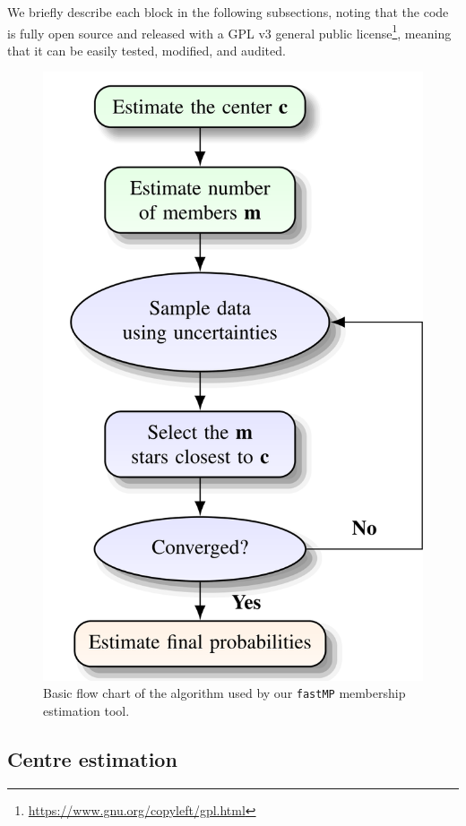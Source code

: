 \documentclass[fleqn,usenatbib]{mnras}
\begin{document}
We briefly describe each block in the following subsections, noting that the
code is fully open source and released with a GPL v3 general public
license\footnote{\url{https://www.gnu.org/copyleft/gpl.html}}, meaning that it
can be easily tested, modified, and audited.

\begin{figure}
	\includegraphics[width=\columnwidth]{figs/flowchart.png}
    \caption{Basic flow chart of the algorithm used by our \texttt{fastMP}
    membership estimation tool.}
    \label{fig:fastMP_code}
\end{figure}


\subsection{Centre estimation}
\end{document}
